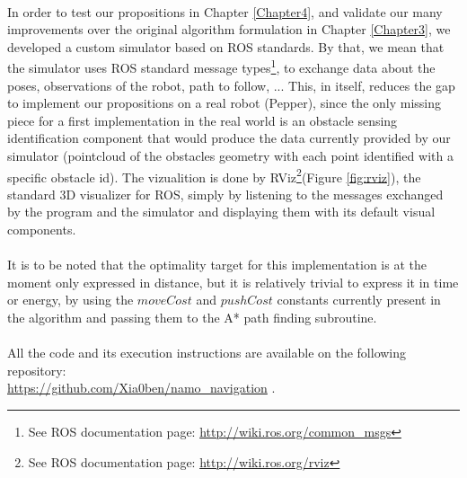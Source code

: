 \paragraph{} In order to test our propositions in Chapter \ref{Chapter4}, and validate our many improvements over the original algorithm formulation in Chapter \ref{Chapter3}, we developed a custom simulator based on ROS standards. By that, we mean that the simulator uses ROS standard message types\footnote{See ROS documentation page: \url{http://wiki.ros.org/common_msgs}}, to exchange data about the poses, observations of the robot, path to follow, ... This, in itself, reduces the gap to implement our propositions on a real robot (Pepper), since the only missing piece for a first implementation in the real world is an obstacle sensing identification component that would produce the data currently provided by our simulator (pointcloud of the obstacles geometry with each point identified with a specific obstacle id). The vizualition is done by RViz\footnote{See ROS documentation page: \url{http://wiki.ros.org/rviz}}(Figure \ref{fig:rviz}), the standard 3D visualizer for ROS, simply by listening to the messages exchanged by the program and the simulator and displaying them with its default visual components.

\paragraph{} It is to be noted that the optimality target for this implementation is at the moment only expressed in distance, but it is relatively trivial to express it in time or energy, by using the $moveCost$ and $pushCost$ constants currently present in the algorithm and passing them to the A* path finding subroutine.

\paragraph{} All the code and its execution instructions are available on the following repository: \\ \url{https://github.com/Xia0ben/namo_navigation} .

